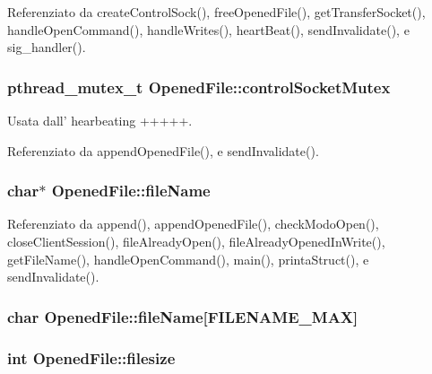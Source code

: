 Referenziato da create\+Control\+Sock(), free\+Opened\+File(), get\+Transfer\+Socket(), handle\+Open\+Command(), handle\+Writes(), heart\+Beat(), send\+Invalidate(), e sig\+\_\+handler().

\hypertarget{structOpenedFile_a59d8fd7142cc9f6a40828160a0f5fc08}{
\subsubsection[{control\+Socket\+Mutex}]{\setlength{\rightskip}{0pt plus 5cm}pthread\+\_\+mutex\+\_\+t Opened\+File\+::control\+Socket\+Mutex}}\label{structOpenedFile_a59d8fd7142cc9f6a40828160a0f5fc08}


Usata dall' hearbeating +++++. 



Referenziato da append\+Opened\+File(), e send\+Invalidate().

\hypertarget{structOpenedFile_aedf1760d8d86e2f3efbb12cc7f4ce13e}{
\subsubsection[{file\+Name}]{\setlength{\rightskip}{0pt plus 5cm}char$\ast$ Opened\+File\+::file\+Name}}\label{structOpenedFile_aedf1760d8d86e2f3efbb12cc7f4ce13e}


Referenziato da append(), append\+Opened\+File(), check\+Modo\+Open(), close\+Client\+Session(), file\+Already\+Open(), file\+Already\+Opened\+In\+Write(), get\+File\+Name(), handle\+Open\+Command(), main(), printa\+Struct(), e send\+Invalidate().

\hypertarget{structOpenedFile_a060ea540c44e9570b59a0e2297e9d47b}{
\subsubsection[{file\+Name}]{\setlength{\rightskip}{0pt plus 5cm}char Opened\+File\+::file\+Name\mbox{[}F\+I\+L\+E\+N\+A\+M\+E\+\_\+\+M\+A\+X\mbox{]}}}\label{structOpenedFile_a060ea540c44e9570b59a0e2297e9d47b}
\hypertarget{structOpenedFile_a3b2e157f5aad06b65bd017d67fde4eb3}{
\subsubsection[{filesize}]{\setlength{\rightskip}{0pt plus 5cm}int Opened\+File\+::filesize}}\label{structOpenedFile_a3b2e157f5aad06b65bd017d67fde4eb3}


